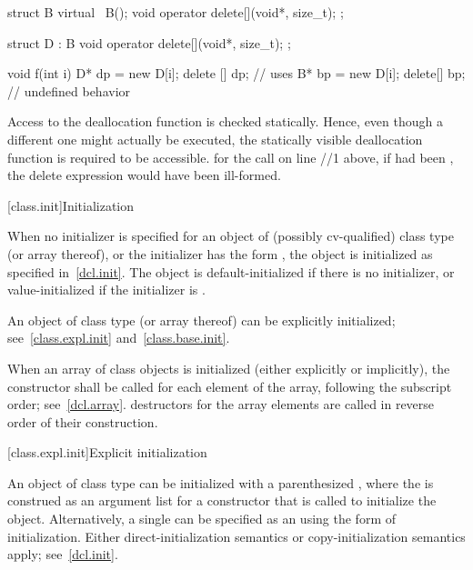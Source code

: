 \begin{codeblock}
struct B {
    virtual ~B();
    void operator delete[](void*, size_t);
};

struct D : B {
    void operator delete[](void*, size_t);
};

void f(int i)
{
    D* dp = new D[i];
    delete [] dp;		// uses 
    B* bp = new D[i];
    delete[] bp;		// undefined behavior
}
\end{codeblock}
\exitnoteb

\pnum
Access to the deallocation function is checked statically.
Hence, even though a different one might actually be executed,
the statically visible deallocation function is required to be accessible.
\enterexample
for the call on line //1 above,
if
had been
,
the delete expression would have been ill-formed.
\exitexample

[class.init]{Initialization}%
%
%

\pnum
When no initializer is specified for an object of (possibly
cv-qualified) class type (or array thereof), or the initializer has
the form
\tcode{()},
the object is initialized as specified in~\ref{dcl.init}.
The object is default-initialized if there is no initializer, or
value-initialized if the initializer is \tcode{()}.

\pnum
An object of class type (or array thereof) can be explicitly initialized;
see~\ref{class.expl.init} and~\ref{class.base.init}.

\pnum
{}%
When an array of class objects is initialized
(either explicitly or implicitly),
the constructor shall be called for each element of the array,
following the subscript order; see~\ref{dcl.array}.
\enternote
destructors for the array elements are called in reverse order of their
construction.
\exitnote

[class.expl.init]{Explicit initialization}%
%
%

\pnum
An object of class type can be initialized with a parenthesized
,
where the
is construed as an argument list for a constructor
that is called to initialize the object.
Alternatively, a single
can be specified as an
using the
\tcode{=}
form of initialization.
Either direct-initialization semantics or copy-initialization semantics apply;
see~\ref{dcl.init}.
%
\enterexample

